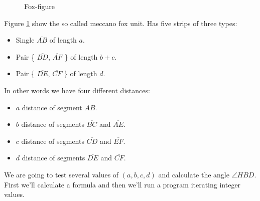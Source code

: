 \documentclass[11pt]{article}
\begin{document}
\begin{figure}[htb]
\caption{Fox-figure}
\label{fig:fox-face}
\end{figure}

Figure \ref{fig:fox-face} show the so called meccano fox unit.
Has five strips of three types:
\begin{itemize}
\item Single $\overline{AB}$ of length $a$.
\item Pair \{ $\overline{BD}$, $\overline{AF}$ \} of length $b+c$.
\item Pair \{ $\overline{DE}$, $\overline{CF}$ \} of length $d$.
\end{itemize}
In other words we have four different distances:
\begin{itemize}
\item $a$ distance of segment $\overline{AB}$.
\item $b$ distance of segments $\overline{BC}$ and $\overline{AE}$.
\item $c$ distance of segments $\overline{CD}$ and $\overline{EF}$.
\item $d$ distance of segments $\overline{DE}$ and $\overline{CF}$.
\end{itemize}
We are going to test several values of $(a,b,c,d)$ and calculate the angle $\angle{HBD}$.
First we'll calculate a formula and then we'll run a program iterating integer values.
\end{document}
